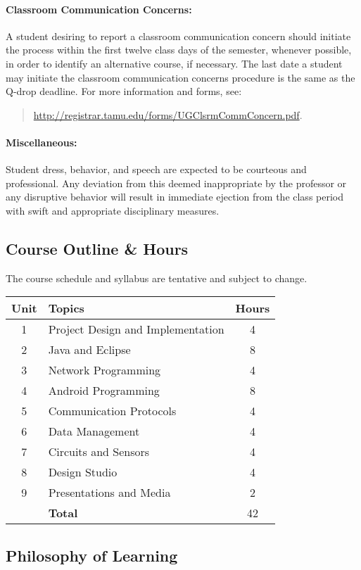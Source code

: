 \documentclass[letterpaper,11pt]{article}
\begin{document}
\paragraph{Classroom Communication Concerns:}
A student desiring to report a classroom communication concern should initiate the process within the first twelve class days of the semester, whenever possible, in order to identify an alternative course, if necessary.
The last date a student may initiate the classroom communication concerns procedure is the same as the Q-drop deadline.
For more information and forms, see:
\begin{quote}
\url{http://registrar.tamu.edu/forms/UGClsrmCommConcern.pdf}.
\end{quote}

\paragraph{Miscellaneous:}
Student dress, behavior, and speech are expected to be courteous and professional.
Any deviation from this deemed inappropriate by the professor or any disruptive behavior will result in immediate ejection from the class period with swift and appropriate disciplinary measures.


\subsection*{Course Outline \& Hours}

The course schedule and syllabus are tentative and subject to change.

\begin{center}
\begin{tabular}{|c|p{8cm}|c|}
\hline
Unit & Topics & Hours \tabularnewline
\hline
1 & Project Design and Implementation & 4 \tabularnewline
\hline
2 & Java and Eclipse & 8 \tabularnewline
\hline
3 & Network Programming & 4 \tabularnewline
\hline
4 & Android Programming & 8 \tabularnewline
\hline
5 & Communication Protocols & 4 \tabularnewline
\hline
6 & Data Management & 4 \tabularnewline
\hline
7 & Circuits and Sensors & 4 \tabularnewline
\hline
8 & Design Studio & 4 \tabularnewline
\hline
9 & Presentations and Media & 2 \tabularnewline
\hline
& \textbf{Total} & 42 \tabularnewline
\hline
\end{tabular}
\end{center}


\subsection*{Philosophy of Learning}
\end{document}
